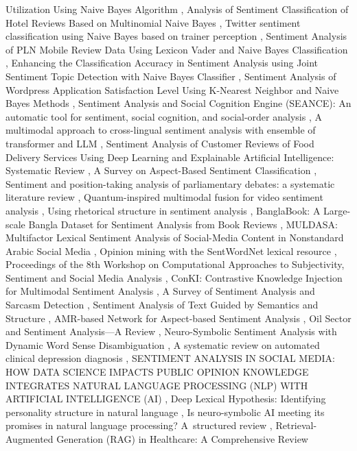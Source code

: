 \documentclass{article}
\begin{document}
Utilization Using Naive Bayes Algorithm \cite{yuniar2025sentimentaf01069c}, Analysis of Sentiment Classification of Hotel Reviews Based on Multinomial Naive Bayes \cite{zhirui2020analysis7e9df95c}, Twitter sentiment classification using Naive Bayes based on trainer perception \cite{ibrahim2015twitter8ea1c52b}, Sentiment Analysis of PLN Mobile Review Data Using Lexicon Vader and Naive Bayes Classification \cite{asri2023sentiment06c2da18}, Enhancing the Classification Accuracy in Sentiment Analysis using Joint Sentiment Topic Detection with Naive Bayes Classifier \cite{kalaivaani2016enhancingb2fe69c8}, Sentiment Analysis of Wordpress Application Satisfaction Level Using K-Nearest Neighbor and Naive Bayes Methods \cite{hamid2025sentimente313680b}, Sentiment Analysis and Social Cognition Engine (SEANCE): An automatic tool for sentiment, social cognition, and social-order analysis \cite{crossley2016sentimente6f85bf3}, A multimodal approach to cross-lingual sentiment analysis with ensemble of transformer and LLM \cite{miah2024multimodal6ed04e56}, Sentiment Analysis of Customer Reviews of Food Delivery Services Using Deep Learning and Explainable Artificial Intelligence: Systematic Review \cite{adak2022sentiment1dd3a5fa}, A Survey on Aspect-Based Sentiment Classification \cite{brauwers2021survey18bf5cde}, Sentiment and position-taking analysis of parliamentary debates: a systematic literature review \cite{abercrombie2020sentimenta45f4c5f}, Quantum-inspired multimodal fusion for video sentiment analysis \cite{li2020quantuminspireddea5ae5a}, Using rhetorical structure in sentiment analysis \cite{hogenboom2015usingbcdd5ee6}, BanglaBook: A Large-scale Bangla Dataset for Sentiment Analysis from Book Reviews \cite{kabir2023banglabook8f8d1681}, MULDASA: Multifactor Lexical Sentiment Analysis of Social-Media Content in Nonstandard Arabic Social Media \cite{alwakid2022muldasa494768c0}, Opinion mining with the SentWordNet lexical resource \cite{ohana2009opinionb1086ed1}, Proceedings of the 8th Workshop on Computational Approaches to Subjectivity, Sentiment and Social Media Analysis \cite{joshi2017proceedingsb60a4ff4}, ConKI: Contrastive Knowledge Injection for Multimodal Sentiment Analysis \cite{yu2023conkif6d19a04}, A Survey of Sentiment Analysis and Sarcasm Detection \cite{yacoub2024surveyec309e9e}, Sentiment Analysis of Text Guided by Semantics and Structure \cite{hogenboom2009sentiment12bb51d1}, AMR-based Network for Aspect-based Sentiment Analysis \cite{ma2023amrbased5cc90650}, Oil Sector and Sentiment Analysis—A Review \cite{santos2023oilf649334f}, Neuro-Symbolic Sentiment Analysis with Dynamic Word Sense Disambiguation \cite{zhang2023neurosymbolic2490f8a5}, A systematic review on automated clinical depression diagnosis \cite{mao2023systematic791ed455}, SENTIMENT ANALYSIS IN SOCIAL MEDIA: HOW DATA SCIENCE IMPACTS PUBLIC OPINION KNOWLEDGE INTEGRATES NATURAL LANGUAGE PROCESSING (NLP) WITH ARTIFICIAL INTELLIGENCE (AI) \cite{alam2025sentiment284f7433}, Deep Lexical Hypothesis: Identifying personality structure in natural language \cite{cutler2022deep59d94f2d}, Is neuro-symbolic AI meeting its promises in natural language processing? A structured review \cite{hamilton2022neurosymbolicf89bd5ec}, Retrieval-Augmented Generation (RAG) in Healthcare: A Comprehensive Review 
\end{document}
